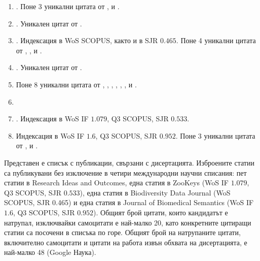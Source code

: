 \begin{enumerate}
\item {}. Поне 3 уникални цитата от \cite{franz_increase_2018}, \cite{ordynets_aphyllophoroid_2017} и \cite{burt_origin_2017}.
\item {}. Уникален цитат от \cite{pyron_21st_2018}.
\item {}. Индексация в WoS SCOPUS, както и в SJR $0.465$. Поне 4 уникални цитата от \cite{bachman_quantifying_2018}, \cite{lin_draft_2017}, \cite{li_genomic_2017} и \cite{milano_conservazione_2017}.
\item {}. Уникален цитат от \cite{ordynets_aphyllophoroid_2017}.
\item {} Поне 8 уникални цитата от \cite{tennant_multi-disciplinary_2017}, \cite{marwick_standard_2017},  \cite{kissling_towards_2018},  \cite{mathieu_egrowth:_2018}, \cite{__2018}, \cite{__2017}, \cite{filippova_biodiversity_2017} и  \cite{__2017-1}.
\item {} 
\item {}. Индексация в WoS IF $1.079$, Q3 SCOPUS, SJR $0.533$.
\item {} Индексация в WoS IF $1.6$, Q3 SCOPUS, SJR $0.952$. Поне 3 уникални цитата от \cite{michel_modelling_2018}, \cite{page_ozymandias:_2018} и \cite{page_liberating_2018}.
\end{enumerate}
\endgroup

Представен е списък с публикации, свързани с дисертацията. Изброените статии са публикувани без изключение в четири международни научни списания: пет статии в Research Ideas and Outcomes, една статия в ZooKeys (WoS IF $1.079$, Q3 SCOPUS, SJR $0.533$), една статия в Biodiversity Data Journal (WoS SCOPUS, SJR 0.465) и една статия в Journal of Biomedical Semantics (WoS IF $1.6$, Q3 SCOPUS, SJR $0.952$). Общият брой цитати, които кандидатът е натрупал, изключвайки самоцитати е най-малко 20, като конкретните цитиращи статии са посочени в списъка по горе. Общият брой на натрупаните цитати, включително самоцитати и цитати на работа извън обхвата на дисертацията, е най-малко 48 (Google Наука).

